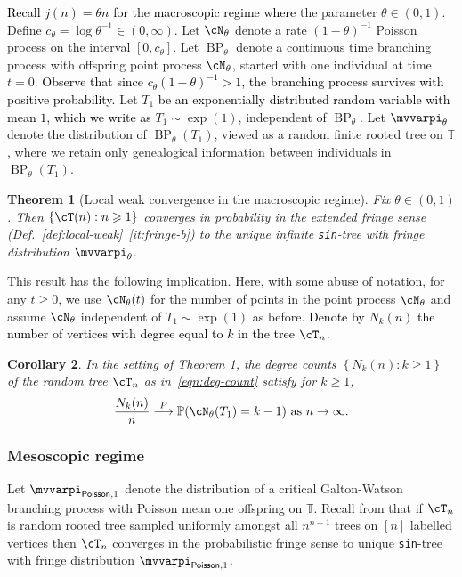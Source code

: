 \documentclass[letterpaper,11pt,reqno]{amsart}
\newtheorem{thm}{Theorem}[section]
\newtheorem{cor}[thm]{Corollary}
\theoremstyle{definition}
\renewcommand{\geq}{\geqslant}
\newcommand{\set}[1]{\left\{#1\right\}}
\newcommand{\bbT}{\mathbb{T}}
\newcommand{\prob}{\mathbb{P}}
\newcommand{\convp}{\stackrel{P}{\longrightarrow}}
\DeclareMathOperator{\BP}{BP}
\newcommand{\Poi}{{\sf Poisson} }
\newcommand{\fpm}{\mvvarpi}
\begin{document}
\textcolor{black}{Recall $j(n)=\theta n$ for the macroscopic regime where} the parameter $\theta \in (0,1)$. Define $c_\theta  = \log{\theta^{-1}} \in (0,\infty)$. Let $\cN_\theta$ denote a rate $(1-\theta)^{-1}$ Poisson process on the interval $[0,c_\theta]$. Let $\BP_\theta$ denote a continuous time branching process with offspring point process $\cN_\theta$, started with one individual at time $t=0$. \textcolor{black}{Observe that since $c_{\theta}(1-\theta)^{-1}>1$, the branching process survives with positive probability.} Let $T_1$ \textcolor{black}{be an exponentially distributed random variable with mean $1$, which we write as} $T_1\sim \exp(1)$, independent of $\BP_\theta$. Let $\fpm_{\theta}$ denote the distribution of $\BP_{\theta}(T_1)$, viewed as a random finite rooted tree on $\bbT$, where we retain only genealogical information between individuals in $\BP_{\theta}(T_1)$. 

\begin{thm}[Local weak convergence in the macroscopic regime]
\label{thm:lwc-macro}
    Fix $\theta \in (0,1)$. Then $\set{\cT(n):n\geq 1}$ converges in probability in the extended fringe sense (Def.~\ref{def:local-weak}~\eqref{it:fringe-b}) to the unique infinite {\tt sin}-tree with fringe distribution $\fpm_{\theta}$. 
\end{thm}

This result has the following implication. Here,  with some abuse of notation, for any $t\geq 0$,  we use $\cN_\theta(t)$ for the number of points in the point process $\cN_\theta$ and assume $\cN_\theta$ independent of $T_1\sim \exp(1)$ as before. \textcolor{black}{Denote by $N_k(n)$ the number of vertices with degree equal to $k$ in the tree $\cT_n$.}

\begin{cor}
    In the setting of Theorem \ref{thm:lwc-macro}, the degree counts $\set{N_k(n):k\geq 1}$ of the random tree $\cT_n$  as in~\eqref{eqn:deg-count}  satisfy for $k\geq 1$,
\[
\frac{N_k(n)}{n} \convp \prob(\cN_\theta(T_1) =k-1) \text{ as } n\to\infty.
\]
\end{cor}




\subsubsection{\bf Mesoscopic regime}

Let $\fpm_{\Poi, 1}$ denote the distribution of a critical Galton-Watson branching process with Poisson mean one offspring on $\bbT$. Recall from \cite{grimmett1980random,aldous-fringe} that if $\cT_n$ is random rooted tree sampled uniformly amongst all $n^{n-1}$ trees on $[n]$ labelled vertices then $\cT_n$ converges in the probabilistic fringe sense to unique {\tt sin}-tree with fringe distribution $\fpm_{\Poi, 1}$. 
\end{document}
